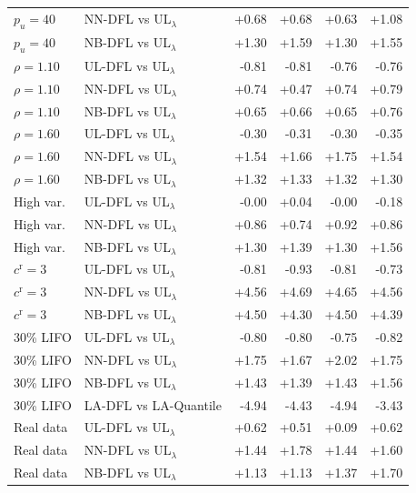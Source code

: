 \begin{tabular}{llrrrr}
$p_u=40$ & NN-DFL vs UL$_\lambda$ & +0.68 & +0.68 & +0.63 & +1.08 \\
$p_u=40$ & NB-DFL vs UL$_\lambda$ & +1.30 & +1.59 & +1.30 & +1.55 \\
$\rho=1.10$ & UL-DFL vs UL$_\lambda$ & -0.81 & -0.81 & -0.76 & -0.76 \\
$\rho=1.10$ & NN-DFL vs UL$_\lambda$ & +0.74 & +0.47 & +0.74 & +0.79 \\
$\rho=1.10$ & NB-DFL vs UL$_\lambda$ & +0.65 & +0.66 & +0.65 & +0.76 \\
$\rho=1.60$ & UL-DFL vs UL$_\lambda$ & -0.30 & -0.31 & -0.30 & -0.35 \\
$\rho=1.60$ & NN-DFL vs UL$_\lambda$ & +1.54 & +1.66 & +1.75 & +1.54 \\
$\rho=1.60$ & NB-DFL vs UL$_\lambda$ & +1.32 & +1.33 & +1.32 & +1.30 \\
High var. & UL-DFL vs UL$_\lambda$ & -0.00 & +0.04 & -0.00 & -0.18 \\
High var. & NN-DFL vs UL$_\lambda$ & +0.86 & +0.74 & +0.92 & +0.86 \\
High var. & NB-DFL vs UL$_\lambda$ & +1.30 & +1.39 & +1.30 & +1.56 \\
$c^{\mathrm{r}}=3$ & UL-DFL vs UL$_\lambda$ & -0.81 & -0.93 & -0.81 & -0.73 \\
$c^{\mathrm{r}}=3$ & NN-DFL vs UL$_\lambda$ & +4.56 & +4.69 & +4.65 & +4.56 \\
$c^{\mathrm{r}}=3$ & NB-DFL vs UL$_\lambda$ & +4.50 & +4.30 & +4.50 & +4.39 \\
30\% LIFO & UL-DFL vs UL$_\lambda$ & -0.80 & -0.80 & -0.75 & -0.82 \\
30\% LIFO & NN-DFL vs UL$_\lambda$ & +1.75 & +1.67 & +2.02 & +1.75 \\
30\% LIFO & NB-DFL vs UL$_\lambda$ & +1.43 & +1.39 & +1.43 & +1.56 \\
30\% LIFO & LA-DFL vs LA-Quantile & -4.94 & -4.43 & -4.94 & -3.43 \\
Real data & UL-DFL vs UL$_\lambda$ & +0.62 & +0.51 & +0.09 & +0.62 \\
Real data & NN-DFL vs UL$_\lambda$ & +1.44 & +1.78 & +1.44 & +1.60 \\
Real data & NB-DFL vs UL$_\lambda$ & +1.13 & +1.13 & +1.37 & +1.70 \\
\bottomrule
\end{tabular}
